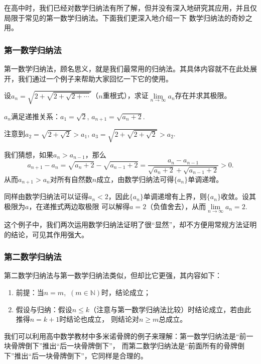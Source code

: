 在高中时，我们已经对数学归纳法有所了解，但并没有深入地研究其应用，并且仅局限于常见的第一数学归纳法。下面我们更深入地介绍一下
数学归纳法的奇妙之用。
\subsubsection{第一数学归纳法}
第一数学归纳法，顾名思义，就是我们最常用的归纳法。其具体内容就不在此处展开，我们通过一个例子来帮助大家回忆一下它的使用。
\begin{example}
    设$a_n=\sqrt{2+\sqrt{2+\sqrt{2+\cdots}}}$（$n$重根式），求证$\lim\limits_{n \to \infty}a_n$存在并求其极限。
\end{example}
\begin{solve}
    $a_n$满足递推关系：$a_1=\sqrt{2}$, $a_{n+1}=\sqrt{a_n+2}$.

    注意到$a_2=\sqrt{2+\sqrt{2}}>a_1$, $a_3=\sqrt{2+\sqrt{2+\sqrt{2}}}>a_2$.

    我们猜想，如果$a_n>a_{n-1}$，那么
    \[
        a_{n+1}-a_n=\sqrt{a_n+2}-\sqrt{a_{n-1}+2}=
        \frac{a_n-a_{n-1}}{\sqrt{a_n+2}+\sqrt{a_{n-1}+2}}>0
        .\]
    从而$a_{n+1}>a_n$对所有自然数$n$成立，由数学归纳法可得$\{ a_n\}$单调递增。


    同样由数学归纳法可以证得$a_n<2$，因此$\{ a_n\}$单调递增有上界，则$\{ a_n\}$收敛。设其极限为$a$，在递推式两边取极限
    可以解得$a=2$（负值舍去），从而$\lim\limits_{n \to \infty}a_n=2$.
\end{solve}
这个例子中，我们两次运用数学归纳法证明了很“显然”，却不方便用常规方法证明的结论，可见其作用强大。
\subsubsection{第二数学归纳法}
第二数学归纳法与第一数学归纳法类似，但却比它更强，其内容如下：

\begin{enumerate}
    \item 前提：当$n=m$,~$(m \in \mathbb{N})$时，结论成立；
    \item 假设与归纳：假设$n\leqslant k$（注意与第一数学归纳法比较）时结论成立，若由此推得$n=k+1$时结论也成立，
          则结论对$n \geqslant m$总成立。

\end{enumerate}

我们可以利用高中数学教材中多米诺骨牌的例子来理解：第一数学归纳法是“前一块骨牌倒下”推出“后一块骨牌倒下”，
而第二数学归纳法是“前面所有的骨牌倒下”推出“后一块骨牌倒下”，它同样是合理的。


